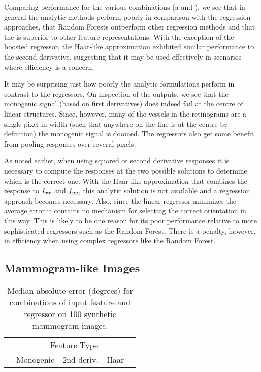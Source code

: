 Comparing performance for the various combinations (a and ), we see that in general the analytic methods perform poorly in comparison with the regression approaches, that Random Forests outperform other regression methods and that the \dtcwt{} is superior to other feature representations. With the exception of the boosted regressor, the Haar-like approximation exhibited similar performance to the second derivative, suggesting that it may be used effectively in scenarios where efficiency is a concern.

It may be surprising just how poorly the analytic formulations perform in contrast to the regressors. On inspection of the outputs, we see that the monogenic signal (based on first derivatives) does indeed fail at the centre of linear structures. Since, however, many of the vessels in the retinograms are a single pixel in width (such that anywhere on the line is at the centre by definition) the monogenic signal is doomed. The regressors also get some benefit from pooling responses over several pixels.

As noted earlier, when using squared or second derivative responses it is necessary to compute the responses at the two possible solutions to determine which is the correct one. With the Haar-like approximation that combines the response to $I_{xx}$ and $I_{yy}$, this analytic solution is not available and a regression approach becomes necessary. Also, since the linear regressor minimizes the average error it contains no mechanism for selecting the correct orientation in this way. This is likely to be one reason for its poor performance relative to more sophisticated regressors such as the Random Forest. There is a penalty, however, in efficiency when using complex regressors like the Random Forest.


\subsection{Mammogram-like Images}
\label{s:expts_synth_mammography}
\begin{table}[t]
\centering
\begin{tabular}{l|c c c c}
							& \multicolumn{4}{c}{Feature Type} \\
							& Monogenic		& 2nd deriv.	& Haar				& \dtcwt{} \\
\hline

\end{tabular}
%
\caption{Median absolute error (degrees) for combinations of input feature and regressor on 100 synthetic mammogram images.}
\label{t:synth_mammography}
\end{table}


